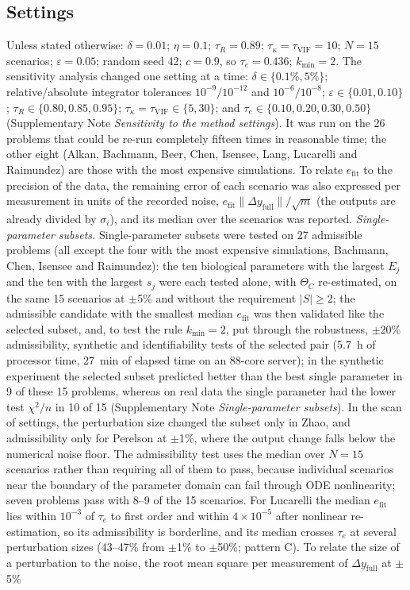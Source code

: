 \documentclass[pdflatex,sn-nature]{sn-jnl}
\theoremstyle{plain}
\begin{document}
\subsection*{Settings}\label{met:settings}

Unless stated otherwise: $\delta=0.01$; $\eta=0.1$; $\tau_R=0.89$; $\tau_\kappa=\tau_{\mathrm{VIF}}=10$; $N=15$ scenarios; $\varepsilon=0.05$; random seed 42; $c=0.9$, so $\tau_e=0.436$; $k_{\min}=2$. The sensitivity analysis changed one setting at a time: $\delta\in\{0.1\%,5\%\}$; relative/absolute integrator tolerances $10^{-9}/10^{-12}$ and $10^{-6}/10^{-8}$; $\varepsilon\in\{0.01,0.10\}$; $\tau_R\in\{0.80,0.85,0.95\}$; $\tau_\kappa=\tau_{\mathrm{VIF}}\in\{5,30\}$; and $\tau_e\in\{0.10,0.20,0.30,0.50\}$ (Supplementary Note \textit{Sensitivity to the method settings}). It was run on the 26 problems that could be re-run completely fifteen times in reasonable time; the other eight (Alkan, Bachmann, Beer, Chen, Isensee, Lang, Lucarelli and Raimundez) are those with the most expensive simulations. To relate $e_{\mathrm{fit}}$ to the precision of the data, the remaining error of each scenario was also expressed per measurement in units of the recorded noise, $e_{\mathrm{fit}}\|\Delta y_{\mathrm{full}}\|/\sqrt{m}$ (the outputs are already divided by $\sigma_i$), and its median over the scenarios was reported. \label{met:single}\emph{Single-parameter subsets.} Single-parameter subsets were tested on 27 admissible problems (all except the four with the most expensive simulations, Bachmann, Chen, Isensee and Raimundez): the ten biological parameters with the largest $E_j$ and the ten with the largest $s_j$ were each tested alone, with $\Theta_C$ re-estimated, on the same 15 scenarios at $\pm$5\% and without the requirement $|S|\ge2$; the admissible candidate with the smallest median $e_{\mathrm{fit}}$ was then validated like the selected subset, and, to test the rule $k_{\min}=2$, put through the robustness, $\pm$20\% admissibility, synthetic and identifiability tests of the selected pair (5.7~h of processor time, 27~min of elapsed time on an 88-core server); in the synthetic experiment the selected subset predicted better than the best single parameter in 9 of these 15 problems, whereas on real data the single parameter had the lower test $\chi^2/n$ in 10 of 15 (Supplementary Note \textit{Single-parameter subsets}). In the scan of settings, the perturbation size changed the subset only in Zhao, and admissibility only for Perelson at $\pm$1\%, where the output change falls below the numerical noise floor. The admissibility test uses the median over $N=15$ scenarios rather than requiring all of them to pass, because individual scenarios near the boundary of the parameter domain can fail through ODE nonlinearity; seven problems pass with 8--9 of the 15 scenarios. For Lucarelli the median $e_{\mathrm{fit}}$ lies within $10^{-3}$ of $\tau_e$ to first order and within $4\times10^{-5}$ after nonlinear re-estimation, so its admissibility is borderline, and its median crosses $\tau_e$ at several perturbation sizes (43--47\% from $\pm$1\% to $\pm$50\%; pattern C). To relate the size of a perturbation to the noise, the root mean square per measurement of $\Delta y_{\mathrm{full}}$ at $\pm$5\% 
\end{document}
